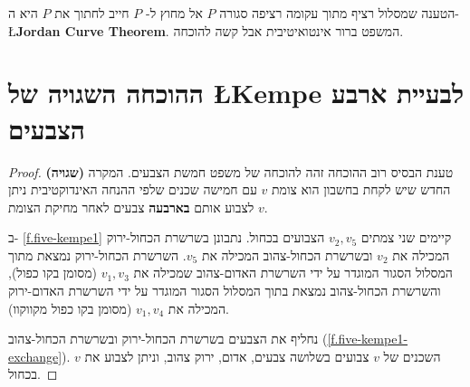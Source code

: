 
\begin{advanced}
הטענה שמסלול רציף מתוך עקומה רציפה סגורה 
$P$
אל מחוץ ל-%
$P$
חייב לחתוך את
$P$
היא ה-%
\L{\textbf{Jordan Curve Theorem}}.
המשפט ברור אינטואיטיבית אבל קשה להוכחה.
\end{advanced}


\section{ההוכחה השגויה של
\L{Kempe}
לבעיית ארבע הצבעים}
\label{s.kempe}

\begin{proof}
\textbf{(שגויה)}
טענת הבסיס רוב ההוכחה זהה להוכחה של משפט חמשת הצבעים. המקרה החדש שיש לקחת בחשבון הוא צומת 
$v$
עם חמישה שכנים שלפי ההנחה האינדוקטיבית ניתן לצבוע אותם
\textbf{בארבעה}
צבעים לאחר מחיקת הצומת
$v$.

ב-%
\ref{f.five-kempe1}
קיימים שני צמתים
$v_2,v_5$
הצבועים בכחול. נתבונן בשרשרת הכחול-ירוק המכילה את 
$v_2$
ובשרשרת הכחול-צהוב המכילה את
$v_5$.
השרשרת הכחול-ירוק נמצאת מתוך המסלול הסגור המוגדר על ידי השרשרת האדום-צהוב שמכילה את
$v_1,v_3$
(מסומן בקו כפול), והשרשרת הכחול-צהוב נמצאת בתוך המסלול הסגור המוגדר על ידי השרשרת האדום-ירוק המכילה את
$v_1,v_4$
(מסומן בקו כפול מקווקוו).

נחליף את הצבעים בשרשרת הכחול-ירוק ובשרשרת הכחול-צהוב 
(\ref{f.five-kempe1-exchange}).
השכנים של
$v$
צבועים בשלושה צבעים, אדום, ירוק צהוב, וניתן לצבוע את
$v$
בכחול.
\end{proof}


